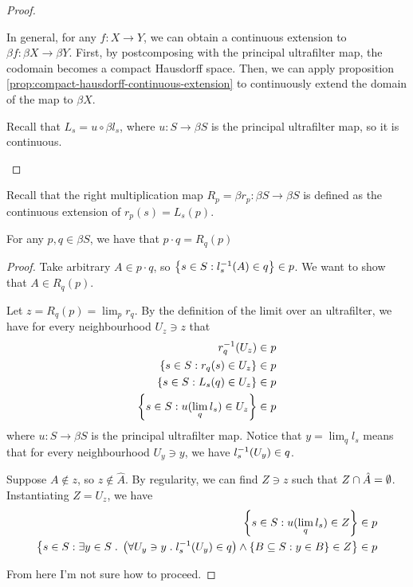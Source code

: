\documentclass[11pt,letterpaper]{article}
\begin{document}
\begin{proof}
\begin{description}
            In general, for any $f : X \to Y$, we can obtain a continuous
            extension to $\beta f : \beta X \to \beta Y$. First, by
            postcomposing with the principal ultrafilter map, the codomain
            becomes a compact Hausdorff space. Then, we can apply proposition
            \ref{prop:compact-hausdorff-continuous-extension} to continuously
            extend the domain of the map to $\beta X$.

            Recall that $L_s = u \circ \beta l_s$, where $u : S \to \beta S$ is
            the principal ultrafilter map, so it is continuous.
    \end{description}
\end{proof}

Recall that the right multiplication map
$R_p = \beta r_p : \beta S \to \beta S$ is defined as the continuous extension
of $r_p(s) = L_s(p)$.

\begin{prop}
    For any $p, q \in \beta S$, we have that $p \cdot q = R_q (p)$
\end{prop}

\begin{proof}
    Take arbitrary $A \in p \cdot q$,
    so $\left\{s \in S : l_s^{-1}(A) \in q\right\} \in p$.
    We want to show that $A \in R_q (p)$.

    Let $z = R_q (p) = \lim_p r_q$.
    By the definition of the limit over an ultrafilter, we have for every
    neighbourhood $U_z \ni z$ that
    \begin{align*}
        r_q^{-1} (U_z) &\in p \\
        \left\{s \in S : r_q(s) \in U_z\right\} &\in p \\
        \left\{s \in S : L_s(q) \in U_z\right\} &\in p \\
        \left\{s \in S : u(\lim_q l_s) \in U_z\right\} &\in p
    \end{align*}
    where $u : S \to \beta S$ is the principal ultrafilter map.
    Notice that $y = \lim_q l_s$ means that for every neighbourhood
    $U_y \ni y$, we have $l_s^{-1} (U_y) \in q$.

    Suppose $A \notin z$, so $z \notin \hat A$.
    By regularity, we can find $Z \ni z$ such that
    $Z \cap \hat A = \emptyset$.
    Instantiating $Z = U_z$, we have
    \begin{align*}
        \left\{s \in S : u(\lim_q l_s) \in Z\right\} &\in p \\
        \left\{
            s \in S :
            \exists y \in S \; . \;
            \left(
                \forall U_y \ni y \; . \;
                l_s^{-1}(U_y) \in q
            \right)
            \land
            \left\{
                B \subseteq S :
                y \in B
            \right\}
            \in Z
        \right\}
        &\in p
    \end{align*}

    From here I'm not sure how to proceed.
\end{proof}
\end{document}
